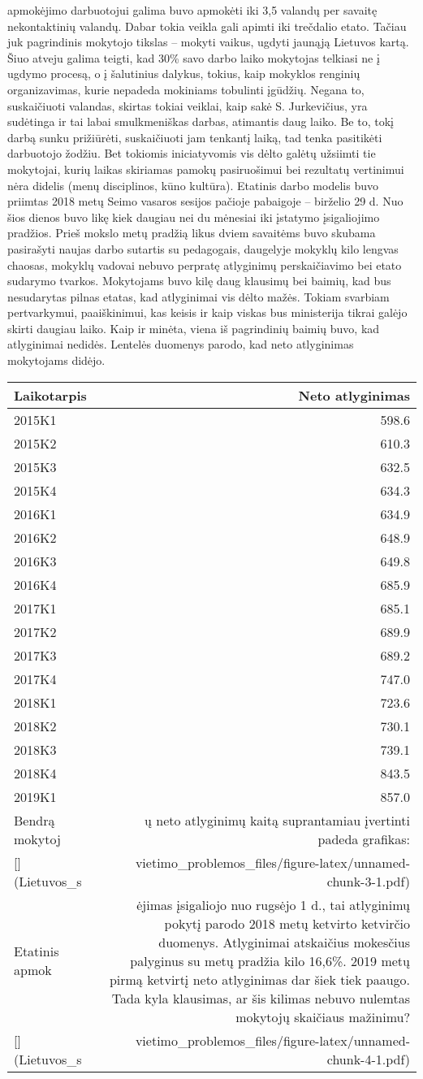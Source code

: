\documentclass[]{article}
\begin{document}
apmokėjimo darbuotojui galima buvo apmokėti iki 3,5 valandų per savaitę
nekontaktinių valandų. Dabar tokia veikla gali apimti iki trečdalio
etato. Tačiau juk pagrindinis mokytojo tikslas -- mokyti vaikus, ugdyti
jaunąją Lietuvos kartą. Šiuo atveju galima teigti, kad 30\% savo darbo
laiko mokytojas telkiasi ne į ugdymo procesą, o į šalutinius dalykus,
tokius, kaip mokyklos renginių organizavimas, kurie nepadeda mokiniams
tobulinti įgūdžių. Negana to, suskaičiuoti valandas, skirtas tokiai
veiklai, kaip sakė S. Jurkevičius, yra sudėtinga ir tai labai
smulkmeniškas darbas, atimantis daug laiko. Be to, tokį darbą sunku
prižiūrėti, suskaičiuoti jam tenkantį laiką, tad tenka pasitikėti
darbuotojo žodžiu. Bet tokiomis iniciatyvomis vis dėlto galėtų užsiimti
tie mokytojai, kurių laikas skiriamas pamokų pasiruošimui bei rezultatų
vertinimui nėra didelis (menų disciplinos, kūno kultūra). Etatinis darbo
modelis buvo priimtas 2018 metų Seimo vasaros sesijos pačioje pabaigoje
-- birželio 29 d. Nuo šios dienos buvo likę kiek daugiau nei du mėnesiai
iki įstatymo įsigaliojimo pradžios. Prieš mokslo metų pradžią likus
dviem savaitėms buvo skubama pasirašyti naujas darbo sutartis su
pedagogais, daugelyje mokyklų kilo lengvas chaosas, mokyklų vadovai
nebuvo perpratę atlyginimų perskaičiavimo bei etato sudarymo tvarkos.
Mokytojams buvo kilę daug klausimų bei baimių, kad bus nesudarytas
pilnas etatas, kad atlyginimai vis dėlto mažės. Tokiam svarbiam
pertvarkymui, paaiškinimui, kas keisis ir kaip viskas bus ministerija
tikrai galėjo skirti daugiau laiko. Kaip ir minėta, viena iš pagrindinių
baimių buvo, kad atlyginimai nedidės. Lentelės duomenys parodo, kad neto
atlyginimas mokytojams didėjo.

\begin{longtable}[]{@{}lr@{}}
\toprule
Laikotarpis & Neto atlyginimas\tabularnewline
\midrule
\endhead
2015K1 & 598.6\tabularnewline
2015K2 & 610.3\tabularnewline
2015K3 & 632.5\tabularnewline
2015K4 & 634.3\tabularnewline
2016K1 & 634.9\tabularnewline
2016K2 & 648.9\tabularnewline
2016K3 & 649.8\tabularnewline
2016K4 & 685.9\tabularnewline
2017K1 & 685.1\tabularnewline
2017K2 & 689.9\tabularnewline
2017K3 & 689.2\tabularnewline
2017K4 & 747.0\tabularnewline
2018K1 & 723.6\tabularnewline
2018K2 & 730.1\tabularnewline
2018K3 & 739.1\tabularnewline
2018K4 & 843.5\tabularnewline
2019K1 & 857.0\tabularnewline
Bendrą mokytoj & ų neto atlyginimų kaitą suprantamiau įvertinti padeda
grafikas:\tabularnewline
{[}{]}(Lietuvos\_s &
vietimo\_problemos\_files/figure-latex/unnamed-chunk-3-1.pdf)\tabularnewline
Etatinis apmok & ėjimas įsigaliojo nuo rugsėjo 1 d., tai atlyginimų
pokytį parodo 2018 metų ketvirto ketvirčio duomenys. Atlyginimai
atskaičius mokesčius palyginus su metų pradžia kilo 16,6\%. 2019 metų
pirmą ketvirtį neto atlyginimas dar šiek tiek paaugo. Tada kyla
klausimas, ar šis kilimas nebuvo nulemtas mokytojų skaičiaus
mažinimu?\tabularnewline
{[}{]}(Lietuvos\_s &
vietimo\_problemos\_files/figure-latex/unnamed-chunk-4-1.pdf)\tabularnewline
\bottomrule
\end{longtable}
\end{document}
